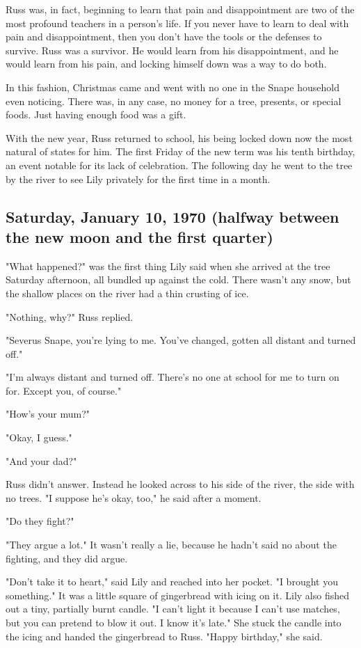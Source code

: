 Russ was, in fact, beginning to learn that pain and disappointment are two of the most profound teachers in a person's life. If you never have to learn to deal with pain and disappointment, then you don't have the tools or the defenses to survive. Russ was a survivor. He would learn from his disappointment, and he would learn from his pain, and locking himself down was a way to do both.

In this fashion, Christmas came and went with no one in the Snape household even noticing. There was, in any case, no money for a tree, presents, or special foods. Just having enough food was a gift.

With the new year, Russ returned to school, his being locked down now the most natural of states for him. The first Friday of the new term was his tenth birthday, an event notable for its lack of celebration. The following day he went to the tree by the river to see Lily privately for the first time in a month.

\subsection{Saturday, January 10, 1970 (halfway between the new moon and the first quarter)}

"What happened?" was the first thing Lily said when she arrived at the tree Saturday afternoon, all bundled up against the cold. There wasn't any snow, but the shallow places on the river had a thin crusting of ice.

"Nothing, why?" Russ replied.

"Severus Snape, you're lying to me. You've changed, gotten all{\el} distant and turned off."

"I'm always distant and turned{\el} off. There's no one at school for me to{\el} turn on for. Except you, of course."

"How's your mum?"

"Okay, I guess."

"And your dad?"

Russ didn't answer. Instead he looked across to his side of the river, the side with no trees. "I suppose he's okay, too," he said after a moment.

"Do they fight?"

"They argue a lot." It wasn't really a lie, because he hadn't said no about the fighting, and they did argue.

"Don't take it to heart," said Lily and reached into her pocket. "I brought you something." It was a little square of gingerbread with icing on it. Lily also fished out a tiny, partially burnt candle. "I can't light it because I can't use matches, but you can pretend to blow it out. I know it's late." She stuck the candle into the icing and handed the gingerbread to Russ. "Happy birthday," she said.

